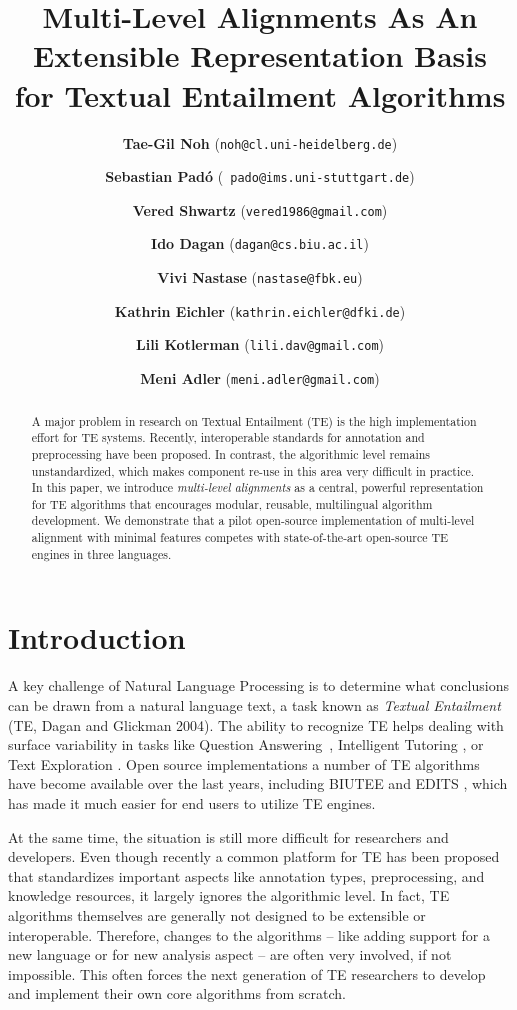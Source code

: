 \documentclass[11pt,letterpaper]{article}
\title{Multi-Level Alignments As An Extensible Representation Basis \\
  for Textual Entailment Algorithms}
\author[1]{\textbf{Tae-Gil Noh} (\texttt{\small noh@cl.uni-heidelberg.de})}
\author[2]{\textbf{Sebastian Pad{\'o}} (\texttt{\small
     pado@ims.uni-stuttgart.de})}
\author[3]{\authorcr \textbf{Vered Shwartz} (\texttt{\small vered1986@gmail.com})}
\author[3]{\textbf{Ido Dagan} (\texttt{\small dagan@cs.biu.ac.il})}
\author[4]{\authorcr \textbf{Vivi Nastase} (\texttt{\small nastase@fbk.eu})} %
\author[5]{\textbf{Kathrin Eichler} (\texttt{\small kathrin.eichler@dfki.de})}
\author[3]{\authorcr \textbf{Lili Kotlerman} (\texttt{\small lili.dav@gmail.com})}
\author[3]{\textbf{Meni Adler} (\texttt{\small meni.adler@gmail.com})}
\affil[1]{Institute of Computational Linguistics, Heidelberg University, Germany}
\affil[2]{Institute of Natural Language Processing, Stuttgart University, Germany}
\affil[3]{Department of Computer Science, Bar-Ilan University, Israel}
\affil[4]{Human Language Technologies, Fondazione Bruno Kessler, Italy}
\affil[5]{Language Technology Lab, DFKI GmbH, Germany}
\date{}
\begin{document}
\maketitle
\begin{abstract}
  A major problem in research on Textual Entailment (TE) is the high
  implementation effort for TE systems. Recently, interoperable
  standards for annotation and preprocessing have been proposed. In
  contrast, the algorithmic level remains unstandardized, which
  makes component re-use in this area very difficult in
  practice.
%
%
%
  In this paper, we introduce {\em multi-level alignments} as a
  central, powerful representation for TE algorithms that encourages
  modular, reusable, multilingual algorithm development.
  We demonstrate that a pilot open-source implementation of
  multi-level alignment with minimal features competes with
  state-of-the-art open-source TE engines in three languages.
\end{abstract}

\section{Introduction}
A key challenge of Natural Language Processing is to determine what
conclusions can be drawn from a natural language text, a task known as
\textit{Textual Entailment} (TE, Dagan and Glickman
2004).\nocite{dagan04:_probab_textual_entail} The ability to recognize
TE helps dealing with surface variability in tasks like Question
Answering~\cite{harabagiu-hickl:2006:COLACL}, Intelligent Tutoring
\cite{nielsen09:_recog_entail_in_intel_tutor_system}, or Text
Exploration \cite{berant2012learning}. Open source implementations a
number of TE algorithms have become available over the last years,
including BIUTEE \cite{Stern:2012} and EDITS \cite{Kouylekov:2010},
which has made it much easier for end users to utilize TE engines.

At the same time, the situation is still more difficult for
researchers and developers. Even though recently a common platform for
TE has been proposed \cite{EOP-arch} that standardizes important
aspects like annotation types, preprocessing, and knowledge resources,
it largely ignores the algorithmic level. In fact, TE algorithms
themselves are generally not designed to be extensible or
interoperable. Therefore, changes to the algorithms -- like adding
support for a new language or for new analysis aspect -- are often
very involved, if not impossible. This often forces the next
generation of TE researchers to develop and implement their own core
algorithms from scratch.
\end{document}
